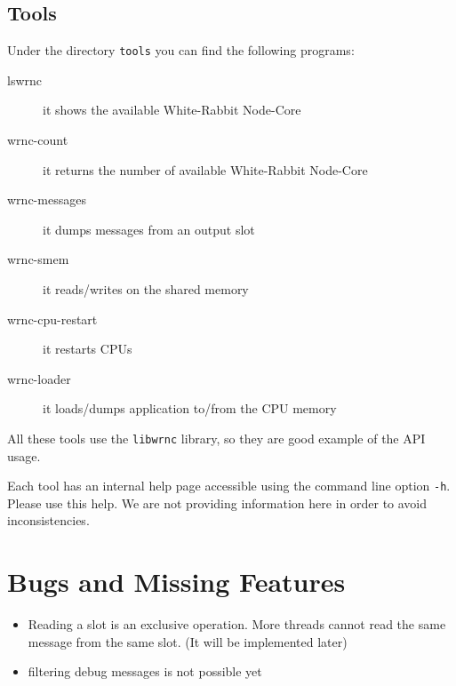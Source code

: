 \documentclass[a4paper,10pt]{article}
\begin{document}
\subsection{Tools}%
Under the directory \texttt{tools} you can find the following
programs:

\begin{description}
  \item[lswrnc] it shows the available White-Rabbit Node-Core
  \item[wrnc-count] it returns the number of available White-Rabbit
    Node-Core
  \item[wrnc-messages] it dumps messages from an output slot
  \item[wrnc-smem] it reads/writes on the shared memory
  \item[wrnc-cpu-restart] it restarts CPUs
  \item[wrnc-loader] it loads/dumps application to/from the CPU memory
\end{description}

All these tools use the \texttt{libwrnc} library, so they are good
example of the API usage.

Each tool has an internal help page accessible using the
command line option \texttt{-h}. Please use this help. We are not
providing information here in order to avoid inconsistencies.

\section{Bugs and Missing Features}%
\begin{itemize}
  \item Reading a slot is an exclusive operation. More threads cannot
    read the same message from the same slot. (It will be implemented
    later)
  \item filtering debug messages is not possible yet
\end{itemize}
\end{document}
